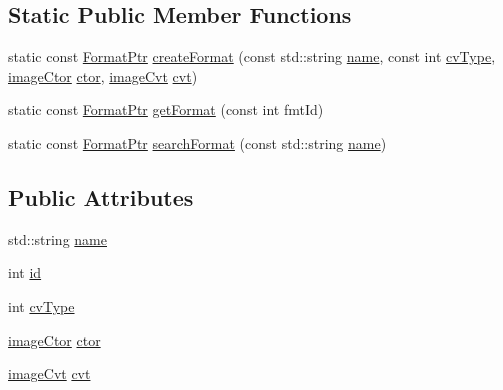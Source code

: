 \subsection*{Static Public Member Functions}
\begin{DoxyCompactItemize}
\item 
static const \hyperlink{classcolorspaces_1_1_image_ab3978cc7acc2b5e855f8c715f09667d1}{Format\+Ptr} \hyperlink{classcolorspaces_1_1_image_1_1_format_ae79208f237b72cf596331ebcec2ff58b}{create\+Format} (const std\+::string \hyperlink{classcolorspaces_1_1_image_1_1_format_a0b2fef0398d48a881a56d38e04ad94b8}{name}, const int \hyperlink{classcolorspaces_1_1_image_1_1_format_a98396a43290ed1b2530caf35e858daa9}{cv\+Type}, \hyperlink{classcolorspaces_1_1_image_a5d086f8bb03d6eab9c3accfd0040e28d}{image\+Ctor} \hyperlink{classcolorspaces_1_1_image_1_1_format_a8aab62c6ca6ae1280cb4ba07702a5991}{ctor}, \hyperlink{classcolorspaces_1_1_image_a8d8b6c8b517caac4cb685f4d73e2c8dc}{image\+Cvt} \hyperlink{classcolorspaces_1_1_image_1_1_format_ab7b83a3ddf1666e728782722dc3c081f}{cvt})
\item 
static const \hyperlink{classcolorspaces_1_1_image_ab3978cc7acc2b5e855f8c715f09667d1}{Format\+Ptr} \hyperlink{classcolorspaces_1_1_image_1_1_format_afce4bc32d3c2827791b13a7c92a5c22f}{get\+Format} (const int fmt\+Id)
\item 
static const \hyperlink{classcolorspaces_1_1_image_ab3978cc7acc2b5e855f8c715f09667d1}{Format\+Ptr} \hyperlink{classcolorspaces_1_1_image_1_1_format_a6aab83855bf18ba00c86bccc79075d0c}{search\+Format} (const std\+::string \hyperlink{classcolorspaces_1_1_image_1_1_format_a0b2fef0398d48a881a56d38e04ad94b8}{name})
\end{DoxyCompactItemize}
\subsection*{Public Attributes}
\begin{DoxyCompactItemize}
\item 
std\+::string \hyperlink{classcolorspaces_1_1_image_1_1_format_a0b2fef0398d48a881a56d38e04ad94b8}{name}
\item 
int \hyperlink{classcolorspaces_1_1_image_1_1_format_af1ffb2ff3d465a7bcd608f35c01d11de}{id}
\item 
int \hyperlink{classcolorspaces_1_1_image_1_1_format_a98396a43290ed1b2530caf35e858daa9}{cv\+Type}
\item 
\hyperlink{classcolorspaces_1_1_image_a5d086f8bb03d6eab9c3accfd0040e28d}{image\+Ctor} \hyperlink{classcolorspaces_1_1_image_1_1_format_a8aab62c6ca6ae1280cb4ba07702a5991}{ctor}
\item 
\hyperlink{classcolorspaces_1_1_image_a8d8b6c8b517caac4cb685f4d73e2c8dc}{image\+Cvt} \hyperlink{classcolorspaces_1_1_image_1_1_format_ab7b83a3ddf1666e728782722dc3c081f}{cvt}
\end{DoxyCompactItemize}


